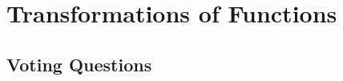 \section{Transformations of Functions} \label{S:0.3.Transformations}


\newpage

\newpage

\newpage

\newpage

\newpage
\subsection*{Voting Questions}

\newpage
